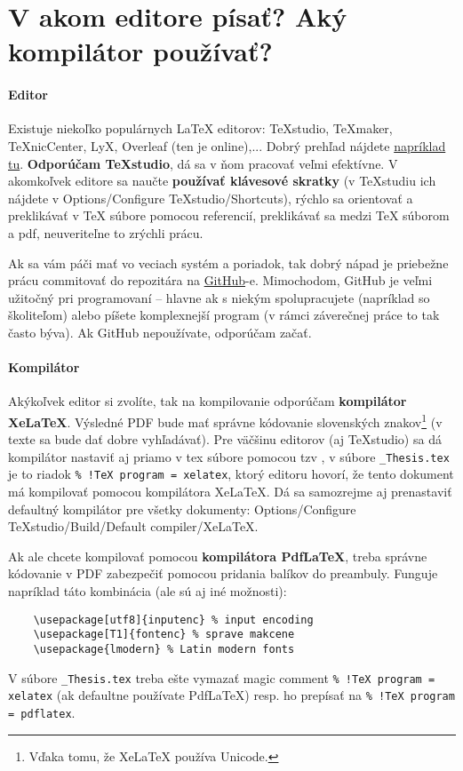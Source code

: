\chapter{V akom editore písať? Aký kompilátor používať?}\label{sec:aky_editor}

\subsubsection{Editor}
Existuje niekoľko populárnych LaTeX editorov: TeXstudio, TeXmaker, TeXnicCenter, LyX, Overleaf (ten je online),... Dobrý prehľad nájdete \href{https://beebom.com/best-latex-editors/}{napríklad tu}. \textbf{Odporúčam TeXstudio}, dá sa v ňom pracovať veľmi efektívne. V akomkoľvek editore sa naučte \textbf{používať klávesové skratky} (v TeXstudiu ich nájdete v Options/Configure TeXstudio/Shortcuts), rýchlo sa orientovať a preklikávať v TeX súbore pomocou referencií, preklikávať sa medzi TeX súborom a pdf, neuveriteľne to zrýchli prácu.

Ak sa vám páči mať vo veciach systém a poriadok, tak dobrý nápad je priebežne prácu commitovať do repozitára na \href{https://github.com/}{GitHub}-e. Mimochodom, GitHub je veľmi užitočný pri programovaní -- hlavne ak s niekým spolupracujete (napríklad so školiteľom) alebo píšete komplexnejší program (v rámci záverečnej práce to tak často býva). Ak GitHub nepoužívate, odporúčam začať.

\subsubsection{Kompilátor}
Akýkoľvek editor si zvolíte, tak na kompilovanie odporúčam \textbf{kompilátor XeLaTeX}. Výsledné PDF bude mať správne kódovanie slovenských znakov\footnote{Vďaka tomu, že XeLaTeX používa Unicode.} (v texte sa bude dať dobre vyhľadávať). Pre väčšinu editorov (aj TeXstudio) sa dá kompilátor nastaviť aj priamo v tex súbore pomocou tzv , v súbore \verb|_Thesis.tex| je to riadok \verb|% !TeX program = xelatex|, ktorý editoru hovorí, že tento dokument má kompilovať pomocou kompilátora XeLaTeX. Dá sa samozrejme aj prenastaviť defaultný kompilátor pre všetky dokumenty: Options/Configure TeXstudio/Build/Default compiler/XeLaTeX.

Ak ale chcete kompilovať pomocou \textbf{kompilátora PdfLaTeX}, treba správne kódovanie v PDF zabezpečiť pomocou pridania balíkov do preambuly. Funguje napríklad táto kombinácia (ale sú aj iné možnosti):
\begin{verbatim}
	\usepackage[utf8]{inputenc} % input encoding
	\usepackage[T1]{fontenc} % sprave makcene
	\usepackage{lmodern} % Latin modern fonts
\end{verbatim}
V súbore \verb|_Thesis.tex| treba ešte vymazať magic comment \verb|% !TeX program = xelatex| (ak defaultne používate PdfLaTeX) resp. ho prepísať na \verb|% !TeX program = pdflatex|.

